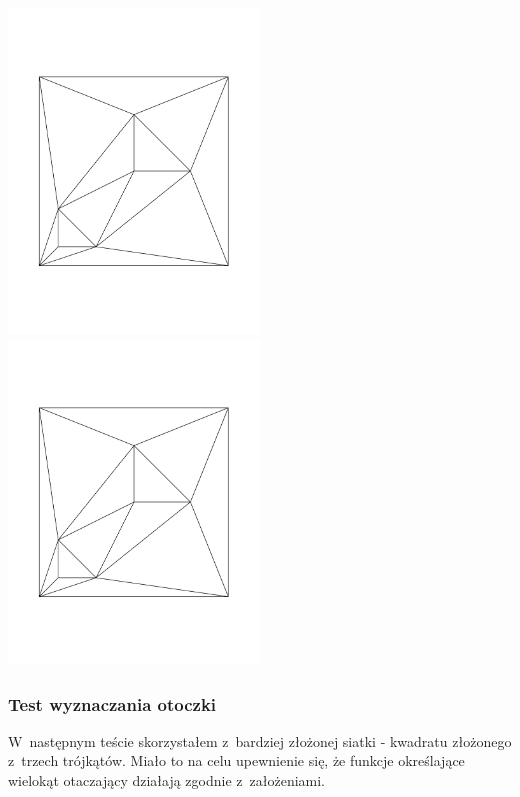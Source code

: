 \documentclass[a4paper]{article} \usepackage{setspace}
\begin{document}
\includegraphics[width=0.5\textwidth]{1_trojkat.pdf}
\includegraphics[width=0.5\textwidth]{2_trojkaty.pdf}

\subsubsection{Test wyznaczania otoczki}
W~następnym teście skorzystałem z~bardziej złożonej siatki - kwadratu złożonego z~trzech trójkątów.
Miało to na celu upewnienie się, że funkcje określające wielokąt otaczający działają zgodnie z~założeniami.
\end{document}
